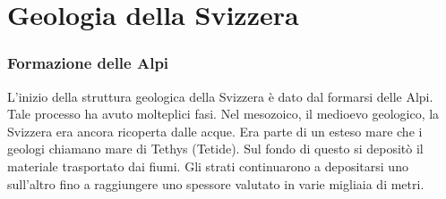 \documentclass[a4paper]{article}
\begin{document}
\pagebreak

\part{Geologia della Svizzera}

\section{Formazione delle Alpi}

L'inizio della struttura geologica della Svizzera è dato dal formarsi delle Alpi. Tale processo
ha avuto molteplici fasi. Nel mesozoico, il medioevo geologico, la Svizzera era ancora ricoperta
dalle acque. Era parte di un esteso mare che i geologi chiamano mare di Tethys (Tetide). Sul
fondo di questo si depositò il materiale trasportato dai fiumi. Gli strati continuarono a
depositarsi uno sull'altro fino a raggiungere uno spessore valutato in varie migliaia di metri.
\end{document}
